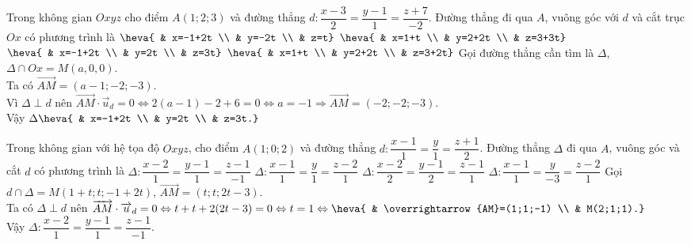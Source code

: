 \begin{ex}%
	Trong không gian $Oxyz$ cho điểm $A(1;2;3)$ và đường thẳng $d\colon \dfrac{x-3}{2}=\dfrac{y-1}{1}=\dfrac{z+7}{-2}$. Đường thẳng đi qua $A$, vuông góc với $d$ và cắt trục $Ox$ có phương trình là
	\choice
	{$\heva{ & x=-1+2t \\ & y=-2t \\ & z=t}$}
	{$\heva{ & x=1+t \\ & y=2+2t \\ & z=3+3t}$}
	{\True $\heva{ & x=-1+2t \\ & y=2t \\ & z=3t}$}
	{$\heva{ & x=1+t \\ & y=2+2t \\ & z=3+2t}$}
	\loigiai
	{
		Gọi đường thẳng cần tìm là $\Delta$, $\Delta \cap Ox=M(a,0,0)$.\\
		Ta có $\overrightarrow{AM}=(a-1;-2;-3)$.\\
		Vì $\Delta\perp d$ nên $\overrightarrow{AM}\cdot\overrightarrow{u}_{d}=0\Leftrightarrow 2(a-1)-2+6=0\Leftrightarrow a=-1\Rightarrow \overrightarrow{AM}=(-2;-2;-3)$.\\
		Vậy $\Delta \heva{ & x=-1+2t \\ & y=2t \\ & z=3t.}$
	}
\end{ex}

\begin{ex}%
	Trong không gian với hệ tọa độ $Oxyz$, cho điểm  $A(1;0;2)$ và đường thẳng $d\colon \dfrac{x-1}{1}=\dfrac{y}{1}=\dfrac{z+1}{2}$. Đường thẳng $\Delta$ đi qua $A$, vuông góc và cắt $d$ có phương trình là
	\choice
	{\True $\Delta\colon \dfrac{x-2}{1}=\dfrac{y-1}{1}=\dfrac{z-1}{-1}$}
	{$\Delta\colon \dfrac{x-1}{1}=\dfrac{y}{1}=\dfrac{z-2}{1}$}
	{$\Delta\colon \dfrac{x-2}{2}=\dfrac{y-1}{2}=\dfrac{z-1}{1}$}
	{$\Delta\colon \dfrac{x-1}{1}=\dfrac{y}{-3}=\dfrac{z-2}{1}$}
	\loigiai
	{
		Gọi $d\cap\Delta=M(1+t;t;-1+2t)$, $\overrightarrow{AM}=(t;t;2t-3)$.\\
		Ta có $\Delta\perp d$ nên $\overrightarrow{AM}\cdot\overrightarrow{u}_{d}=0 \Leftrightarrow t+t+2(2t-3)=0 \Leftrightarrow t=1 \Leftrightarrow \heva{ & \overrightarrow{AM}=(1;1;-1) \\ & M(2;1;1).}$\\
		Vậy $\Delta\colon \dfrac{x-2}{1}=\dfrac{y-1}{1}=\dfrac{z-1}{-1}$.
	}
\end{ex}

